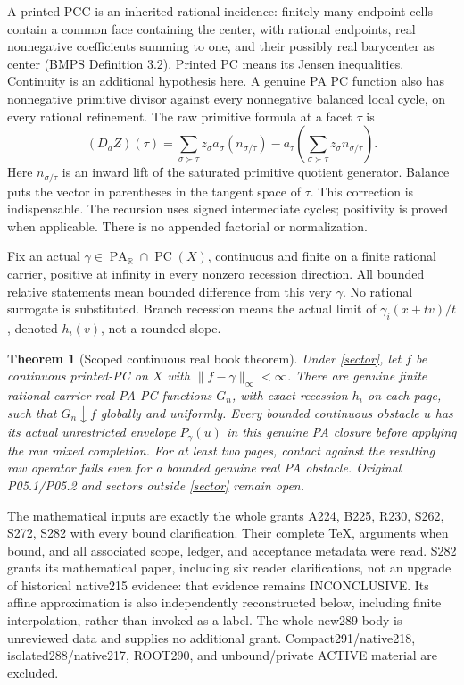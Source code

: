 \documentclass[11pt]{article}
\newtheorem{theorem}{Theorem}[section]
\theoremstyle{definition}\newtheorem{definition}[theorem]{Definition}
\theoremstyle{remark}\newtheorem{remark}[theorem]{Remark}
\newcommand{\R}{\mathbb R}\newcommand{\Q}{\mathbb Q}
\newcommand{\PA}{\operatorname{PA}}\newcommand{\PC}{\operatorname{PC}}
\begin{document}
A printed PCC is an inherited rational incidence: finitely many endpoint cells contain a common face containing the center, with rational endpoints, real nonnegative coefficients summing to one, and their possibly real barycenter as center (BMPS Definition 3.2). Printed PC means its Jensen inequalities. Continuity is an additional hypothesis here. A genuine PA PC function also has nonnegative primitive divisor against every nonnegative balanced local cycle, on every rational refinement. The raw primitive formula at a facet $\tau$ is
\begin{equation}\label{primitive}
(D_a Z)(\tau)=\sum_{\sigma\succ\tau}z_\sigma a_\sigma(n_{\sigma/\tau})
-a_\tau\left(\sum_{\sigma\succ\tau}z_\sigma n_{\sigma/\tau}\right).
\end{equation}
Here $n_{\sigma/\tau}$ is an inward lift of the saturated primitive quotient generator. Balance puts the vector in parentheses in the tangent space of $\tau$. This correction is indispensable. The recursion uses signed intermediate cycles; positivity is proved when applicable. There is no appended factorial or normalization.

Fix an actual $\gamma\in\PA_{\R}\cap\PC(X)$, continuous and finite on a finite rational carrier, positive at infinity in every nonzero recession direction. All bounded relative statements mean bounded difference from this very $\gamma$. No rational surrogate is substituted. Branch recession means the actual limit of $\gamma_i(x+tv)/t$, denoted $h_i(v)$, not a rounded slope.

\begin{theorem}[Scoped continuous real book theorem]\label{main}
Under \eqref{sector}, let $f$ be continuous printed-PC on $X$ with $\|f-\gamma\|_\infty<\infty$. There are genuine finite rational-carrier real PA PC functions $G_n$, with exact recession $h_i$ on each page, such that $G_n\downarrow f$ globally and uniformly. Every bounded continuous obstacle $u$ has its actual unrestricted envelope $P_\gamma(u)$ in this genuine PA closure before applying the raw mixed completion. For at least two pages, contact against the resulting raw operator fails even for a bounded genuine real PA obstacle. Original P05.1/P05.2 and sectors outside \eqref{sector} remain open.
\end{theorem}

The mathematical inputs are exactly the whole grants A224, B225, R230, S262, S272, S282 with every bound clarification. Their complete TeX, arguments when bound, and all associated scope, ledger, and acceptance metadata were read. S282 grants its mathematical paper, including six reader clarifications, not an upgrade of historical native215 evidence: that evidence remains INCONCLUSIVE. Its affine approximation is also independently reconstructed below, including finite interpolation, rather than invoked as a label. The whole new289 body is unreviewed data and supplies no additional grant. Compact291/native218, isolated288/native217, ROOT290, and unbound/private ACTIVE material are excluded.
\end{document}
